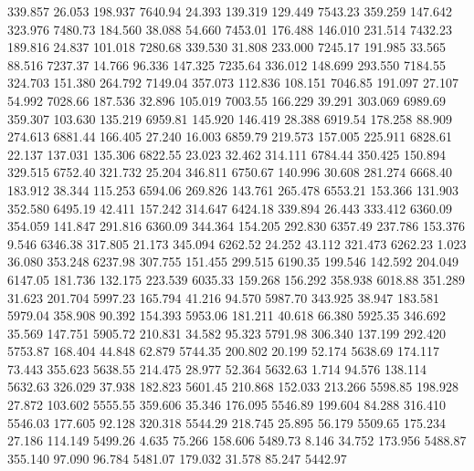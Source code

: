  339.857   26.053  198.937      7640.94
  24.393  139.319  129.449      7543.23
 359.259  147.642  323.976      7480.73
 184.560   38.088   54.660      7453.01
 176.488  146.010  231.514      7432.23
 189.816   24.837  101.018      7280.68
 339.530   31.808  233.000      7245.17
 191.985   33.565   88.516      7237.37
  14.766   96.336  147.325      7235.64
 336.012  148.699  293.550      7184.55
 324.703  151.380  264.792      7149.04
 357.073  112.836  108.151      7046.85
 191.097   27.107   54.992      7028.66
 187.536   32.896  105.019      7003.55
 166.229   39.291  303.069      6989.69
 359.307  103.630  135.219      6959.81
 145.920  146.419   28.388      6919.54
 178.258   88.909  274.613      6881.44
 166.405   27.240   16.003      6859.79
 219.573  157.005  225.911      6828.61
  22.137  137.031  135.306      6822.55
  23.023   32.462  314.111      6784.44
 350.425  150.894  329.515      6752.40
 321.732   25.204  346.811      6750.67
 140.996   30.608  281.274      6668.40
 183.912   38.344  115.253      6594.06
 269.826  143.761  265.478      6553.21
 153.366  131.903  352.580      6495.19
  42.411  157.242  314.647      6424.18
 339.894   26.443  333.412      6360.09
 354.059  141.847  291.816      6360.09
 344.364  154.205  292.830      6357.49
 237.786  153.376    9.546      6346.38
 317.805   21.173  345.094      6262.52
  24.252   43.112  321.473      6262.23
   1.023   36.080  353.248      6237.98
 307.755  151.455  299.515      6190.35
 199.546  142.592  204.049      6147.05
 181.736  132.175  223.539      6035.33
 159.268  156.292  358.938      6018.88
 351.289   31.623  201.704      5997.23
 165.794   41.216   94.570      5987.70
 343.925   38.947  183.581      5979.04
 358.908   90.392  154.393      5953.06
 181.211   40.618   66.380      5925.35
 346.692   35.569  147.751      5905.72
 210.831   34.582   95.323      5791.98
 306.340  137.199  292.420      5753.87
 168.404   44.848   62.879      5744.35
 200.802   20.199   52.174      5638.69
 174.117   73.443  355.623      5638.55
 214.475   28.977   52.364      5632.63
   1.714   94.576  138.114      5632.63
 326.029   37.938  182.823      5601.45
 210.868  152.033  213.266      5598.85
 198.928   27.872  103.602      5555.55
 359.606   35.346  176.095      5546.89
 199.604   84.288  316.410      5546.03
 177.605   92.128  320.318      5544.29
 218.745   25.895   56.179      5509.65
 175.234   27.186  114.149      5499.26
   4.635   75.266  158.606      5489.73
   8.146   34.752  173.956      5488.87
 355.140   97.090   96.784      5481.07
 179.032   31.578   85.247      5442.97
